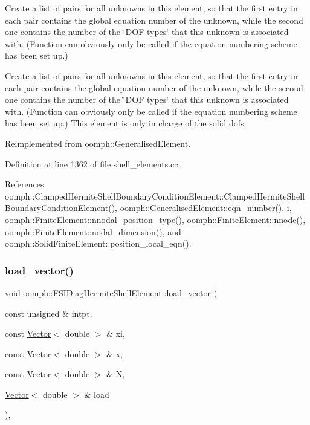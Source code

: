 Create a list of pairs for all unknowns in this element, so that the first entry in each pair contains the global equation number of the unknown, while the second one contains the number of the \char`\"{}\+D\+O\+F types\char`\"{} that this unknown is associated with. (Function can obviously only be called if the equation numbering scheme has been set up.) 

Create a list of pairs for all unknowns in this element, so that the first entry in each pair contains the global equation number of the unknown, while the second one contains the number of the \char`\"{}\+D\+O\+F types\char`\"{} that this unknown is associated with. (Function can obviously only be called if the equation numbering scheme has been set up.) This element is only in charge of the solid dofs. 

Reimplemented from \hyperlink{classoomph_1_1GeneralisedElement_a069f59bfc3e607a5bebba52c6314d777}{oomph\+::\+Generalised\+Element}.



Definition at line 1362 of file shell\+\_\+elements.\+cc.



References oomph\+::\+Clamped\+Hermite\+Shell\+Boundary\+Condition\+Element\+::\+Clamped\+Hermite\+Shell\+Boundary\+Condition\+Element(), oomph\+::\+Generalised\+Element\+::eqn\+\_\+number(), i, oomph\+::\+Finite\+Element\+::nnodal\+\_\+position\+\_\+type(), oomph\+::\+Finite\+Element\+::nnode(), oomph\+::\+Finite\+Element\+::nodal\+\_\+dimension(), and oomph\+::\+Solid\+Finite\+Element\+::position\+\_\+local\+\_\+eqn().

\mbox{\label{classoomph_1_1FSIDiagHermiteShellElement_a1ef92a7c7157b252fdfc624ab5bc6165}} 
\subsubsection{\texorpdfstring{load\+\_\+vector()}{load\_vector()}}
{\footnotesize\ttfamily void oomph\+::\+F\+S\+I\+Diag\+Hermite\+Shell\+Element\+::load\+\_\+vector (\begin{DoxyParamCaption}\item[{const unsigned \&}]{intpt,  }\item[{const \hyperlink{classoomph_1_1Vector}{Vector}$<$ double $>$ \&}]{xi,  }\item[{const \hyperlink{classoomph_1_1Vector}{Vector}$<$ double $>$ \&}]{x,  }\item[{const \hyperlink{classoomph_1_1Vector}{Vector}$<$ double $>$ \&}]{N,  }\item[{\hyperlink{classoomph_1_1Vector}{Vector}$<$ double $>$ \&}]{load }\end{DoxyParamCaption})\hspace{0.3cm}{\ttfamily [inline]}, {\ttfamily [virtual]}}



